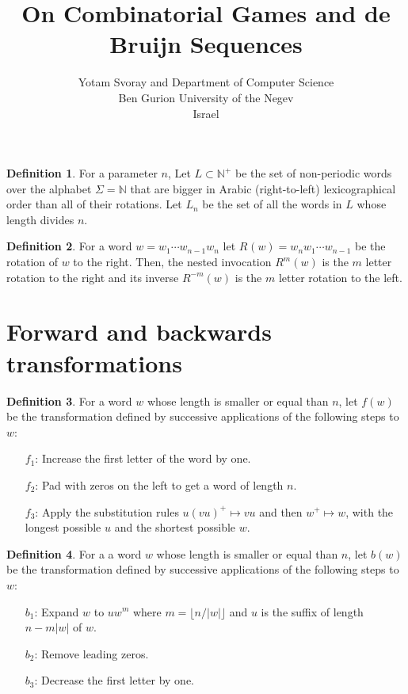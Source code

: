\documentclass{article}
\title{On Combinatorial Games and de Bruijn Sequences}
\author{Yotam Svoray and %
	Department of Computer Science \\
	Ben Gurion University of the Negev\\
	Israel
}
\theoremstyle{definition}
\newtheorem{definition}{Definition}
\newcommand{\N}{{\mathbb{N}}}
\newcommand{\rr}[2]{R^{#2}({#1})}
\newcommand{\rl}[2]{R^{-{#2}}({#1})}
\begin{document}
\begin{definition}
	For a parameter $n$, Let $L \subset \N^+$ be the set of non-periodic words over the alphabet $\Sigma=\N$ that are bigger in Arabic (right-to-left) lexicographical order than all of their rotations. Let $L_n$ be the set of all the words in $L$ whose length divides $n$.
\end{definition}


\begin{definition}
	For a word $w=w_1\cdots w_{n-1}w_n$ let  $\rr{w}{}= w_{n}w_1\cdots w_{n-1}$ be the rotation of $w$ to the right. Then, the nested invocation $\rr{w}{m}$ is the $m$ letter rotation to the right and its inverse $\rl{w}{m}$ is the $m$ letter rotation to the left.
\end{definition}

	
\section{Forward and backwards transformations}


\begin{definition}\label{forward}
For a word $w$ whose length is smaller or equal than $n$, let  $f(w)$ be the transformation defined by successive applications of the following steps to $w$:
\begin{enumerate}
	\item[$f_1$:] Increase the first letter of the word by one. 
	\item[$f_2$:] Pad with zeros on the left to get a word of length $n$.
	\item[$f_3$:] Apply the substitution rules $u(vu)^+ \mapsto vu$ and then $w^+ \mapsto w$, with the longest possible $u$ and the shortest possible $w$.
\end{enumerate}
\end{definition}

\begin{definition}\label{backward}
For a a word $w$ whose length is smaller or equal than $n$, let  $b(w)$ be the transformation defined by successive applications of the following steps to $w$:
\begin{enumerate}
	\item[$b_1$:] Expand $w$ to $u w^m$ where $m=\lfloor n/ |w| \rfloor$ and $u$ is the suffix of length $n-m|w|$ of $w$.
	
	\item[$b_2$:] Remove leading zeros.
	\item[$b_3$:] Decrease the first letter by one.
\end{enumerate}
\end{definition}
\end{document}
